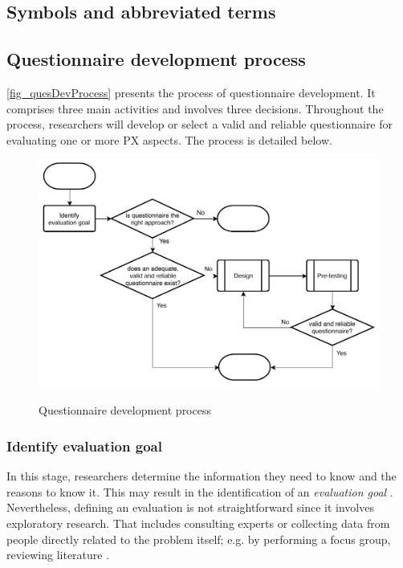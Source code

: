 \subsection{Symbols and abbreviated terms}
\begin{acronym}[UML]
\end{acronym}

\subsection{Questionnaire development process}

\autoref{fig_quesDevProcess} presents the process of questionnaire development. It comprises three main activities and involves three decisions. Throughout the process, researchers will develop or select a valid and reliable questionnaire for evaluating one or more \ac{PX} aspects. The process is detailed below.

\begin{figure}[htb]
\myfloatalign
{\includegraphics[width=0.9\linewidth]{gfx/standard/quesDevProcess}} \quad
\caption{Questionnaire development process}\label{fig_quesDevProcess}
\end{figure}

\subsubsection{Identify evaluation goal}
In this stage, researchers determine the information they need to know and the reasons to know it. This may result in the identification of an \emph{evaluation goal} \autocite{Diem,Radhakrishna2007,Crawford1997}. Nevertheless, defining an evaluation is not straightforward since it involves exploratory research. That includes consulting experts or collecting data from people directly related to the problem itself; e.g. by performing a focus group, reviewing literature \autocite{Crawford1997}.

